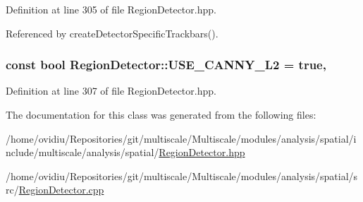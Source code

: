 Definition at line 305 of file Region\-Detector.\-hpp.



Referenced by create\-Detector\-Specific\-Trackbars().

\hypertarget{classmultiscale_1_1analysis_1_1RegionDetector_a6a8c4f7b9a6bc40ec6de940f53943772}{
\subsubsection[{U\-S\-E\-\_\-\-C\-A\-N\-N\-Y\-\_\-\-L2}]{\setlength{\rightskip}{0pt plus 5cm}const bool Region\-Detector\-::\-U\-S\-E\-\_\-\-C\-A\-N\-N\-Y\-\_\-\-L2 = true\hspace{0.3cm}{\ttfamily [static]}, {\ttfamily [private]}}}\label{classmultiscale_1_1analysis_1_1RegionDetector_a6a8c4f7b9a6bc40ec6de940f53943772}


Definition at line 307 of file Region\-Detector.\-hpp.



The documentation for this class was generated from the following files\-:\begin{DoxyCompactItemize}
\item 
/home/ovidiu/\-Repositories/git/multiscale/\-Multiscale/modules/analysis/spatial/include/multiscale/analysis/spatial/\hyperlink{RegionDetector_8hpp}{Region\-Detector.\-hpp}\item 
/home/ovidiu/\-Repositories/git/multiscale/\-Multiscale/modules/analysis/spatial/src/\hyperlink{RegionDetector_8cpp}{Region\-Detector.\-cpp}\end{DoxyCompactItemize}
